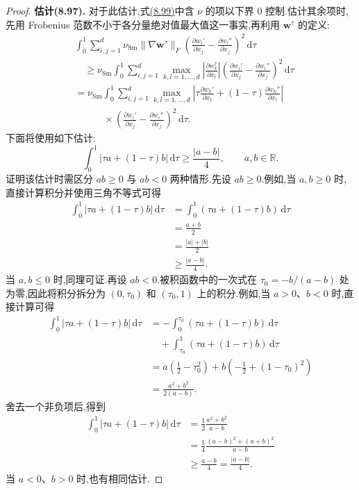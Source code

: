\begin{lemma}[非线性黏性算子的强单调性]
\begin{proof}
\textbf{估计(8.97).} 对于此估计,式\hyperref[eq:smagorinsky-monotonicity-expansion]{(8.99)}中含 $\nu$ 的项以下界 $0$ 控制.估计其余项时,先用 Frobenius 范数不小于各分量绝对值最大值这一事实,再利用 $\bm{w}^{\tau}$ 的定义:
\begin{equation}\label{eq:smagorinsky-monotonicity-max-bound}
\begin{aligned}
 &\int_0^1\sum_{i,j=1}^{d}
       \nu_{\mathrm{Sm}}\|\nabla\bm{w}^{\tau}\|_F
       \left(\frac{\partial w_i'}{\partial x_j}
                    -\frac{\partial w_i''}{\partial x_j}\right)^2
                                                \,\mathrm{d}\tau\\
 &\quad\ge\nu_{\mathrm{Sm}}\int_0^1\sum_{i,j=1}^{d}
       \max_{k,l=1,\ldots,d}
       \left|\frac{\partial w_k^{\tau}}{\partial x_l}\right|
       \left(\frac{\partial w_i'}{\partial x_j}
                    -\frac{\partial w_i''}{\partial x_j}\right)^2
                                                \,\mathrm{d}\tau\\
 &=\nu_{\mathrm{Sm}}\int_0^1\sum_{i,j=1}^{d}
       \max_{k,l=1,\ldots,d}
       \left|\tau\frac{\partial w_k'}{\partial x_l}
             +(1-\tau)\frac{\partial w_k''}{\partial x_l}\right|\\
 &\qquad\quad\times
       \left(\frac{\partial w_i'}{\partial x_j}
                    -\frac{\partial w_i''}{\partial x_j}\right)^2
                                                \,\mathrm{d}\tau.
\end{aligned}
\end{equation}
下面将使用如下估计:
\[
 \int_0^1|\tau a+(1-\tau)b|\,\mathrm{d}\tau
 \ge \frac{|a-b|}{4},\qquad a,b\in\mathbb{R}.
\]
证明该估计时需区分 $ab\ge0$ 与 $ab<0$ 两种情形.先设 $ab\ge0$.例如,当 $a,b\ge0$ 时,直接计算积分并使用三角不等式可得
\[
\begin{aligned}
 \int_0^1|\tau a+(1-\tau)b|\,\mathrm{d}\tau
 &=\int_0^1(\tau a+(1-\tau)b)\,\mathrm{d}\tau\\
 &=\frac{a+b}{2}\\
 &=\frac{|a|+|b|}{2}\\
 &\ge\frac{|a-b|}{4}.
\end{aligned}
\]
当 $a,b\le0$ 时,同理可证.再设 $ab<0$.被积函数中的一次式在
$\tau_0=-b/(a-b)$ 处为零,因此将积分拆分为 $(0,\tau_0)$ 和 $(\tau_0,1)$ 上的积分.例如,当 $a>0$、$b<0$ 时,直接计算可得
\[
\begin{aligned}
 \int_0^1|\tau a+(1-\tau)b|\,\mathrm{d}\tau
 &=-\int_0^{\tau_0}(\tau a+(1-\tau)b)\,\mathrm{d}\tau\\
 &\quad+\int_{\tau_0}^1(\tau a+(1-\tau)b)\,\mathrm{d}\tau\\
 &=a\left(\frac12-\tau_0^2\right)
   +b\left(-\frac12+(1-\tau_0)^2\right)\\
 &=\frac{a^2+b^2}{2(a-b)}.
\end{aligned}
\]
舍去一个非负项后,得到
\[
\begin{aligned}
 \int_0^1|\tau a+(1-\tau)b|\,\mathrm{d}\tau
 &=\frac12\frac{a^2+b^2}{a-b}\\
 &=\frac14\frac{(a-b)^2+(a+b)^2}{a-b}\\
 &\ge\frac{a-b}{4}=\frac{|a-b|}{4}.
\end{aligned}
\]
当 $a<0$、$b>0$ 时,也有相同估计.


\end{proof}
\end{lemma}

